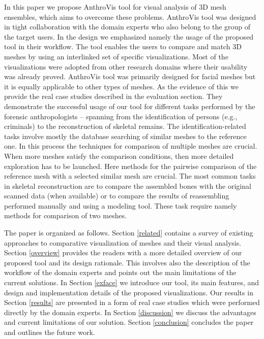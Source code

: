 \documentclass[final,5p,times]{elsarticle}
\begin{document}
In this paper we propose AnthroVis tool for visual analysis of 3D mesh ensembles, which aims to overcome these problems.
AnthroVis tool was designed in tight collaboration with the domain experts who also belong to the group of the target users.
In the design we emphasized namely the usage of the proposed tool in their workflow. 
The tool enables the users to compare and match 3D meshes by using an interlinked set of specific visualizations.
Most of the visualizations were adopted from other research domains where their usability was already proved. 
AnthroVis tool was primarily designed for facial meshes but it is equally applicable to other types of meshes.
As the evidence of this we provide the real case studies described in the evaluation section.
They demonstrate the successful usage of our tool for different tasks performed by the forensic anthropologists -- spanning from the identification of persons (e.g., criminals) to the reconstruction of skeletal remains.
The identification-related tasks involve mostly the database \linebreak[4] searching of similar meshes to the reference one. 
In this process the techniques for comparison of multiple meshes are crucial.
When more meshes satisfy the comparison conditions, then more detailed exploration has to be launched.
Here methods for the pairwise comparison of the reference mesh with a selected similar mesh are crucial.  
The most common tasks in skeletal reconstruction are to compare the assembled bones with the original scanned data (when available) or to compare the results of reassembling performed manually and using a modeling tool.
These task require namely methods for comparison of two meshes.

The paper is organized as follows. 
Section \ref{related} contains a survey of existing approaches to comparative visualization of meshes and their visual analysis.
Section \ref{overview} provides the readers with a more detailed overview of our proposed tool and its design rationale.
This involves also the description of the workflow of the domain experts and points out the main limitations of the current solutions.
In Section \ref{exface} we introduce our tool, its main features, and design and implementation details of the proposed visualizations.
Our results in Section \ref{results} are presented in a form of real case studies which were performed directly by the domain experts.
In Section \ref{discussion} we discuss the advantages and current limitations of our solution.
Section \ref{conclusion} concludes the paper and outlines the future work.
\end{document}
